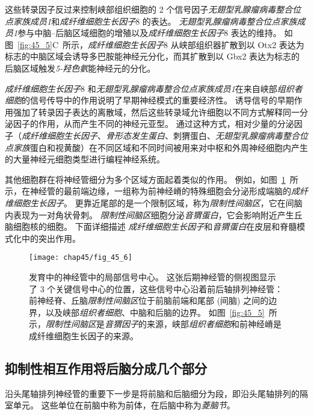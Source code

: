 这些转录因子反过来控制峡部组织细胞的 2 个信号因子\textit{无翅型乳腺瘤病毒整合位点家族成员1}和\textit{成纤维细胞生长因子}8 的表达。
\textit{无翅型乳腺瘤病毒整合位点家族成员1}参与中脑--后脑区域细胞的增殖以及\textit{成纤维细胞生长因子}8 表达的维持。
如图~\ref{fig:45_5}C~所示，\textit{成纤维细胞生长因子}8 从峡部组织器扩散到以 Otx2 表达为标志的中脑区域会诱导多巴胺能神经元分化，而其扩散到以 Gbx2 表达为标志的后脑区域触发\textit{5-羟色氨}能神经元的分化。


\textit{成纤维细胞生长因子}8 和\textit{无翅型乳腺瘤病毒整合位点家族成员1}在来自峡部\textit{组织者细胞}的信号传导中的作用说明了早期神经模式的重要经济性。
诱导信号的早期作用强加了转录因子表达的离散域，然后这些转录域允许细胞以不同方式解释同一分泌因子的作用，从而产生不同的神经元亚型。
通过这种方式，相对少量的分泌因子（\textit{成纤维细胞生长因子}、\textit{骨形态发生蛋白}、刺猬蛋白、\textit{无翅型乳腺瘤病毒整合位点家族}蛋白和视黄酸）在不同区域和不同时间被用来对中枢和外周神经细胞内产生的大量神经元细胞类型进行编程神经系统。


其他细胞群在将神经管细分为多个区域方面起着类似的作用。
例如，如图~\ref{fig:45_6}~所示，在神经管的最前端边缘，一组称为前神经嵴的特殊细胞会分泌形成端脑的\textit{成纤维细胞生长因子}。
更靠近尾部的是一个限制区域，称为\textit{限制性间脑区}，它在间脑内表现为一对角状骨刺。
\textit{限制性间脑区}细胞分泌\textit{音猬蛋白}，它会影响附近产生丘脑细胞核的细胞。
下面详细描述 \textit{成纤维细胞生长因子}和\textit{音猬蛋白}在皮层和脊髓模式化中的突出作用。


\begin{figure}[htbp]
	\centering
	\texttt{[image: chap45/fig\_45\_6]}
	\caption{发育中的神经管中的局部信号中心。
		这张后期神经管的侧视图显示了 3 个关键信号中心的位置，这些信号中心沿着前后轴排列神经管：
		前神经脊、丘脑\textit{限制性间脑区}位于前脑前端和尾部 (间脑) 之间的边界，以及峡部\textit{组织者细胞}、中脑和后脑的边界。
		如图~\ref{fig:45_5}~所示，\textit{限制性间脑区}是\textit{音猬因子}的来源，峡部\textit{组织者细胞}和前神经嵴是成纤维细胞生长因子的来源。}
	\label{fig:45_6}
\end{figure}



\subsection{抑制性相互作用将后脑分成几个部分}

沿头尾轴排列神经管的重要下一步是将前脑和后脑细分为段，即沿头尾轴排列的隔室单元。
这些单位在前脑中称为前体，在后脑中称为\textit{菱脑节}。


